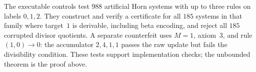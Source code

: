 The executable controls test $988$ artificial Horn systems with up to three
rules on labels $0,1,2$.  They construct and verify a certificate for all
$185$ systems in that family where target~$1$ is derivable, including beta
encoding, and reject all $185$ corrupted divisor quotients.  A separate
counterfeit uses $M=1$, axiom~$3$, and rule $(1,0)\longrightarrow0$:
the accumulator $2,4,1,1$ passes the raw update but fails the divisibility
condition.  These tests support implementation checks; the unbounded theorem
is the proof above.
